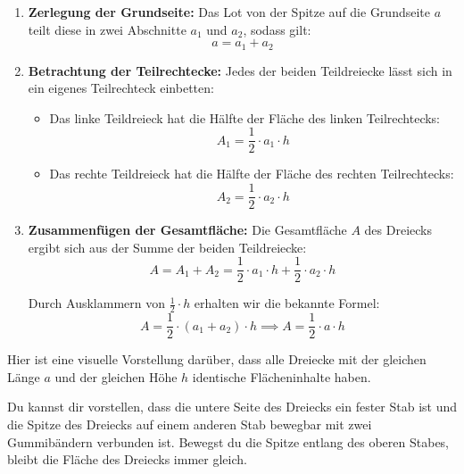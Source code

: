\documentclass{article}
\begin{document}
\begin{enumerate}
    \item \textbf{Zerlegung der Grundseite:} Das Lot von der Spitze auf die Grundseite $a$ teilt diese in zwei Abschnitte $a_1$ und $a_2$, sodass gilt:
    $$a = a_1 + a_2$$

    \item \textbf{Betrachtung der Teilrechtecke:} Jedes der beiden Teildreiecke lässt sich in ein eigenes Teilrechteck einbetten:
    \begin{itemize}
        \item Das linke Teildreieck hat die Hälfte der Fläche des linken Teilrechtecks:
        $$A_1 = \frac{1}{2} \cdot a_1 \cdot h$$
        \item Das rechte Teildreieck hat die Hälfte der Fläche des rechten Teilrechtecks:
        $$A_2 = \frac{1}{2} \cdot a_2 \cdot h$$
    \end{itemize}

    \item \textbf{Zusammenfügen der Gesamtfläche:} Die Gesamtfläche $A$ des Dreiecks ergibt sich aus der Summe der beiden Teildreiecke:
    $$A = A_1 + A_2 = \frac{1}{2} \cdot a_1 \cdot h + \frac{1}{2} \cdot a_2 \cdot h$$

    Durch Ausklammern von $\frac{1}{2} \cdot h$ erhalten wir die bekannte Formel:
    $$A = \frac{1}{2} \cdot (a_1 + a_2) \cdot h \implies A = \frac{1}{2} \cdot a \cdot h$$
\end{enumerate}

Hier ist eine visuelle Vorstellung darüber, dass alle Dreiecke mit der gleichen Länge $a$ und der gleichen Höhe $h$ identische Flächeninhalte haben.

\begin{center}
\centering
{}
\end{center}

Du kannst dir vorstellen, dass die untere Seite des Dreiecks ein fester Stab ist und die Spitze des Dreiecks auf einem anderen Stab bewegbar mit zwei Gummibändern verbunden ist. Bewegst du die Spitze entlang des oberen Stabes, bleibt die Fläche des Dreiecks immer gleich.
\end{document}
